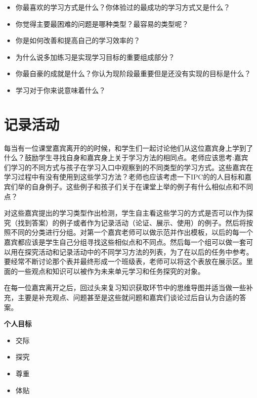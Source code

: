     \begin{itemize}
       \item  你最喜欢的学习方式是什么？你体验过的最成功的学习方式又是什么？
       \item  你觉得主要最困难的问题是哪种类型？最容易的类型呢？
       \item  你是如何改善和提高自己的学习效率的？
       \item  为什么说多加练习是实现学习目标的重要组成部分？
       \item  你最自豪的成就是什么？你认为现阶段最重要但是还没有实现的目标是什么？
       \item  学习对于你来说意味着什么？
    \end{itemize}

\section{记录活动}
     每当有一位课堂嘉宾离开的的时候，和学生们一起讨论他们从这位嘉宾身上学到了什么？鼓励学生寻找自身和嘉宾身上关于学习方法的相同点。老师应该思考:嘉宾们学习的不同方式与孩子在学习入口中观察到的不同类型的学习方式。这些嘉宾在学习过程中有没有使用到这些学习方法？老师也应该考虑一下IPC的的人目标和嘉宾们举的自身例子。这些例子和孩子们关于在课堂上举的例子有什么相似点和不同点？\par
     对这些嘉宾提出的学习类型作出检测，学生自主看这些学习的方式是否可以作为探究（找到答案）的例子或者作为记录活动（论证、展示、使用）的例子。然后将按照不同的分类进行分组。对第一个嘉宾老师可以做示范并作出模板，以后的每一个嘉宾都应该是学生自己分组寻找这些相似点和不同点。然后每一个组可以做一套可以用在探究活动和记录活动中的不同学习方法的列表，为了在以后的任务中参考。要经常不断讨论那个表并最终形成一个班级表，老师可以将这个表放在展示区。里面的一些观点和知识可以被作为未来单元学习和任务探究的对象。\par
     在每一位嘉宾离开之后，回过头来复习知识获取环节中的思维导图并适当做一些补充，主要是补充观点、问题甚至是这些就问题和嘉宾们谈论过后自认为合适的答案。\par
     \textbf{个人目标}
     \begin{itemize}
       \item 交际
       \item 探究
       \item 尊重
       \item 体贴   
     \end{itemize}
